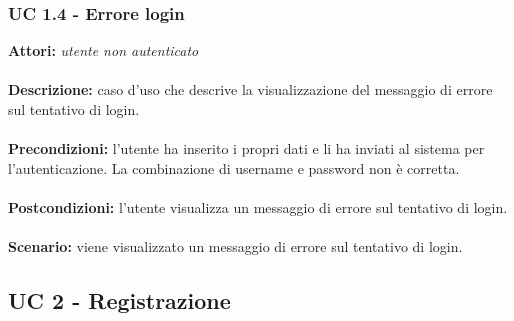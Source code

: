 \documentclass[a4paper,11pt]{article}
\begin{document}
\subsubsection{UC 1.4 - Errore login}

\textbf{Attori:} \textit{utente non autenticato}
\\ \\
\textbf{Descrizione:} caso d'uso che descrive la visualizzazione del messaggio di errore sul tentativo di login.\\
\\
\textbf{Precondizioni:} l'utente ha inserito i propri dati e li ha inviati al sistema per l'autenticazione. La combinazione di username e password non è corretta.\\
\\
\textbf{Postcondizioni:} l’utente visualizza un messaggio di errore sul tentativo di login.\\
\\
\textbf{Scenario:} viene visualizzato un messaggio di errore sul tentativo di login.\\


\subsection{UC 2 - Registrazione}
\end{document}
